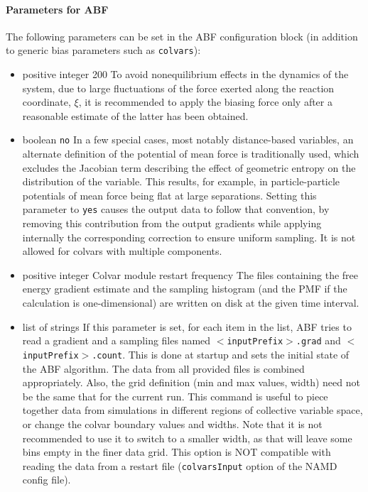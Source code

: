 \paragraph*{Parameters for ABF}

The following parameters can be set in the ABF configuration block
(in addition to generic bias parameters such as \texttt{colvars}):

\begin{itemize}
\item {}
  {positive integer}
  {200}
  {To avoid nonequilibrium effects in the dynamics of the system, due to large
    fluctuations of the force exerted along the reaction coordinate, $\xi$, it
    is recommended to apply the biasing force only after a reasonable estimate
    of the latter has been obtained.}

\item {}
  {boolean}
  {\texttt{no}}
  {In a few special cases, most notably distance-based variables, an alternate definition of
    the potential of mean force is traditionally used, which excludes the Jacobian
    term describing the effect of geometric entropy on the distribution of the variable.
    This results, for example, in particle-particle potentials of mean force being flat
    at large separations.
    Setting this parameter to \texttt{yes} causes the output data to follow that convention,
    by removing this contribution from the output gradients while
    applying internally the corresponding correction to ensure uniform sampling.
    It is not allowed for colvars with multiple components.}

\item {}
  {positive integer}
  {Colvar module restart frequency}
  {The files containing the free energy gradient estimate and the sampling histogram
    (and the PMF if the calculation is one-dimensional) are written on disk at the given
    time interval.}

\item {}
  {list of strings}
  {If this parameter is set, for each item in the list, ABF tries to read
    a gradient and a sampling files named \texttt{$<$inputPrefix$>$.grad}
    and \texttt{$<$inputPrefix$>$.count}. This is done at
    startup and sets the initial state of the ABF algorithm.
    The data from all provided files is combined appropriately.
    Also, the grid definition (min and max values, width) need not be the same
    that for the current run. This command is useful to piece together
    data from simulations in different regions of collective variable space,
    or change the colvar boundary values and widths. Note that it is not
    recommended to use it to switch to a smaller width, as that will leave
    some bins empty in the finer data grid.
    This option is NOT compatible with reading the data from a restart file
    (\texttt{colvarsInput} option of the NAMD config file).}


\end{itemize}
